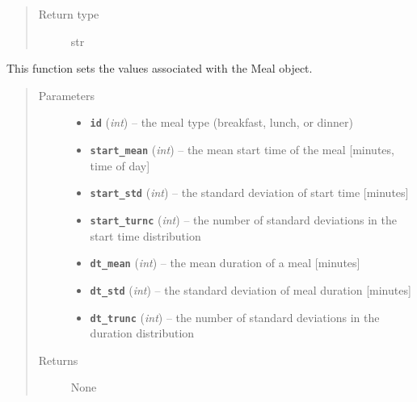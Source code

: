 \documentclass[letterpaper,10pt,english]{sphinxmanual}
\begin{document}
\begin{fulllineitems}
\begin{fulllineitems}
\begin{quote}
\begin{description}
\item[{Return type}] \leavevmode
str

\end{description}\end{quote}

\end{fulllineitems}


\begin{fulllineitems}
\label{meal:meal.Meal.set_meal}
This function sets the values associated with the Meal object.
\begin{quote}\begin{description}
\item[{Parameters}] \leavevmode\begin{itemize}
\item {} 
\textbf{\texttt{id}} (\emph{int}) -- the meal type (breakfast, lunch, or dinner)

\item {} 
\textbf{\texttt{start\_mean}} (\emph{int}) -- the mean start time of the meal {[}minutes, time of day{]}

\item {} 
\textbf{\texttt{start\_std}} (\emph{int}) -- the standard deviation of start time {[}minutes{]}

\item {} 
\textbf{\texttt{start\_turnc}} (\emph{int}) -- the number of standard deviations in the start time distribution

\item {} 
\textbf{\texttt{dt\_mean}} (\emph{int}) -- the mean duration of a meal {[}minutes{]}

\item {} 
\textbf{\texttt{dt\_std}} (\emph{int}) -- the standard deviation of meal duration {[}minutes{]}

\item {} 
\textbf{\texttt{dt\_trunc}} (\emph{int}) -- the number of standard deviations in the duration distribution

\end{itemize}

\item[{Returns}] \leavevmode
None

\end{description}\end{quote}


\end{fulllineitems}
\end{fulllineitems}
\end{document}
